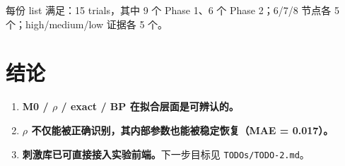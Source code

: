 \documentclass[11pt,a4paper]{ctexart}
\begin{document}
每份 list 满足：15 trials，其中 9 个 Phase 1、6 个 Phase 2；6/7/8 节点各 5 个；high/medium/low 证据各 5 个。

\section{结论}

\begin{enumerate}
    \item \textbf{M0 / $\rho$ / exact / BP 在拟合层面是可辨认的。}
    \item \textbf{$\rho$ 不仅能被正确识别，其内部参数也能被稳定恢复（MAE = 0.017）。}
    \item \textbf{刺激库已可直接接入实验前端。}下一步目标见 \texttt{TODOs/TODO-2.md}。
\end{enumerate}
\end{document}
